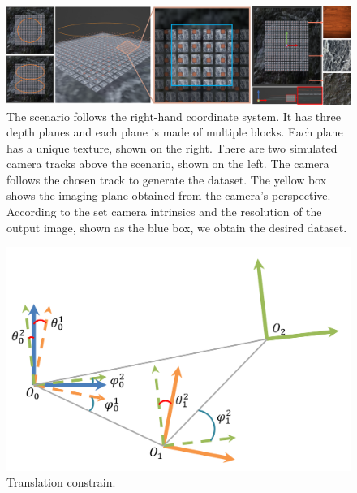 \documentclass[letterpaper, 10 pt, conference]{ieeeconf}  %
\begin{document}

\begin{figure}[t]
    \centering
   \includegraphics[width=1\linewidth]{./images_exp/image1.png}
    \caption{The scenario follows the right-hand coordinate system. It has three depth planes and each plane is made of multiple blocks. Each plane has a unique texture, shown on the right. There are two simulated camera tracks above the scenario, shown on the left. The camera follows the chosen track to generate the dataset. The yellow box shows the imaging plane obtained from the camera's perspective. According to the set camera intrinsics and the resolution of the output image, shown as the blue box, we obtain the desired dataset.}
    \label{fig:scenario}
\end{figure}


\begin{figure}[t]
    \centering
    \includegraphics[width=1\linewidth]{./images/optimization}
    \caption{Translation constrain.}
    \label{fig:trans_constrain}
\end{figure}
\end{document}

